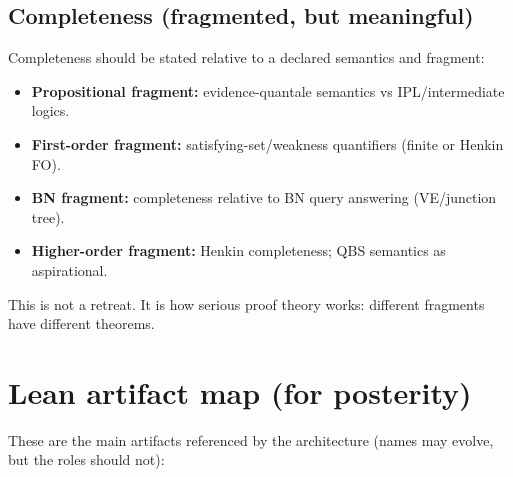 \documentclass[11pt]{article}
\begin{document}
\subsection{Completeness (fragmented, but meaningful)}

Completeness should be stated relative to a declared semantics and fragment:
\begin{itemize}[leftmargin=2em]
\item \textbf{Propositional fragment:} evidence-quantale semantics vs IPL/intermediate logics.
\item \textbf{First-order fragment:} satisfying-set/weakness quantifiers (finite or Henkin FO).
\item \textbf{BN fragment:} completeness relative to BN query answering (VE/junction tree).
\item \textbf{Higher-order fragment:} Henkin completeness; QBS semantics as aspirational.
\end{itemize}

This is not a retreat. It is how serious proof theory works: different fragments have different theorems.

\section{Lean artifact map (for posterity)}

These are the main artifacts referenced by the architecture (names may evolve, but the roles should not):
\end{document}
